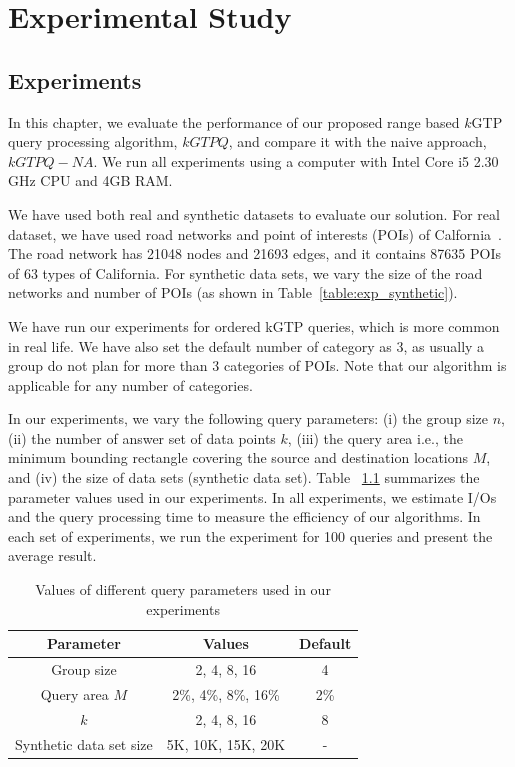 \chapter{Experimental Study}
\section{\label{sec:exp}Experiments}
\label{sec:exp}
In this chapter, we evaluate the performance of our proposed range based $k$GTP query processing algorithm, $kGTPQ$, and compare it with the naive approach, $kGTPQ-NA$. We run all experiments using a computer with Intel Core i5 2.30 GHz CPU and 4GB RAM.


We have used both real and synthetic datasets to evaluate our solution. For real dataset, we have used road networks and point of interests (POIs) of Calfornia~\cite{California}. The road network has 21048 nodes and 21693 edges, and it contains 87635 POIs of 63 types of California. For synthetic data sets, we vary the size of the road networks and number of POIs (as shown in Table~\ref{table:exp_synthetic}).



We have run our experiments for ordered kGTP queries, which is more common in real life. We have also set the default number of category as 3, as usually a group do not plan for more than 3 categories of POIs. Note that our algorithm is applicable for any number of categories.

In our experiments, we vary the following query parameters: (i) the group size $n$, (ii) the number of answer set of data points $k$, (iii) the query area i.e., the minimum bounding rectangle covering the source and destination locations $M$, and (iv) the size of data sets (synthetic data set). Table ~\ref{table:exp_setup} summarizes the parameter values used in our experiments. In all experiments, we estimate I/Os and the query processing time to measure the efficiency of our algorithms. In each set of experiments, we run the experiment for 100 queries and present the average result.

\vspace*{10pt}
\begin{table}[htbp]
  \centering

\begin{tabular}{|c|c|c|}
  \hline
  Parameter& Values & Default\\
  \hline
  Group size & 2, 4, 8, 16 & 4 \\
  \hline
  Query area $M$& 2\%, 4\%, 8\%, 16\% & 2\%\\
  \hline
  $k$ & 2, 4, 8, 16 & 8 \\
  \hline
  Synthetic data set size & 5K, 10K, 15K, 20K & - \\
  \hline
\end{tabular}
\caption{Values of different query parameters used in our experiments} \label{table:exp_setup} \vspace{-2mm}
\end{table}

